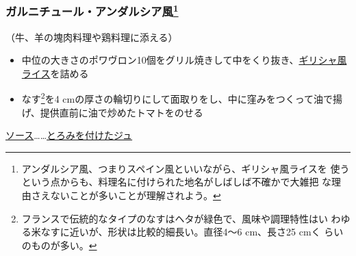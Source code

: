 \begin{recette}
\hypertarget{garniture-andalouse}{%
\subsubsection[ガルニチュール・アンダルシア風]{\texorpdfstring{ガルニチュール・アンダルシア風\footnote{アンダルシア風、つまりスペイン風といいながら、ギリシャ風ライスを
  使うという点からも、料理名に付けられた地名がしばしば不確かで大雑把
  な理由さえないことが多いことが理解されよう。}}{ガルニチュール・アンダルシア風}}\label{garniture-andalouse}}



（牛、羊の塊肉料理や鶏料理に添える）

\begin{itemize}
\item
  中位の大きさのポワヴロン10個をグリル焼きして中をくり抜き、\protect\hyperlink{riz-grecque}{ギリシャ風ライス}を詰める
\item
  なす\footnote{フランスで伝統的なタイプのなすはヘタが緑色で、風味や調理特性はい
    わゆる米なすに近いが、形状は比較的細長い。直径4〜6 cm、長さ25 cmく
    らいのものが多い。}を4
  cmの厚さの輪切りにして面取りをし、中に窪みをつくって油で揚げ、提供直前に油で炒めたトマトをのせる
\end{itemize}

\ul{ソース}\ldots{}\ldots{}\protect\hyperlink{jus-de-veau-lie}{とろみを付けたジュ}

\hypertarget{garniture-arlesienne}{%
}
\end{recette}
